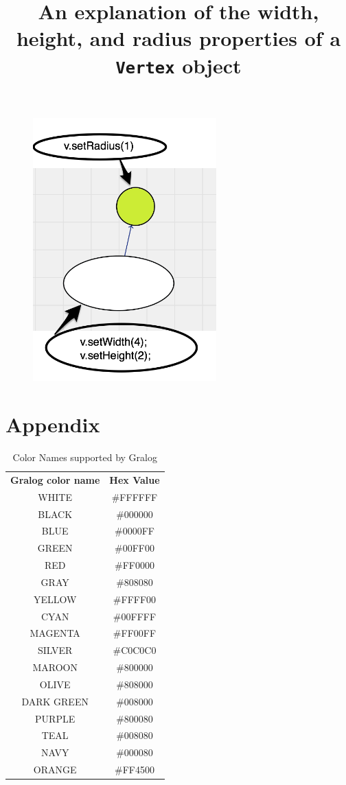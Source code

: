 \documentclass{article}
\begin{document}
\begin{figure}[H]
\title{An explanation of the width, height, and radius properties of a \texttt{Vertex} object}
\label{radiusWidthHeightDiagram}
\centering
\includegraphics[width=200pt]{radiusWidthHeightDiagram.png}
\end{figure}

\section{Appendix}


\begin{table}[h!]
  \begin{center}
    \caption{Color Names supported by Gralog}
    \label{colorNamesSupportedByGralog}
    \begin{tabular}{c|c} %
      \textbf{Gralog color name} & \textbf{Hex Value}\\
      WHITE   &\#FFFFFF\\
\hline
BLACK   &\#000000\\
\hline
BLUE    &\#0000FF\\
\hline
GREEN   &\#00FF00\\
\hline
RED     &\#FF0000\\
\hline
GRAY    &\#808080\\
\hline
YELLOW  &\#FFFF00\\
\hline
CYAN    &\#00FFFF\\
\hline
MAGENTA &\#FF00FF\\
\hline
SILVER  &\#C0C0C0\\
\hline
MAROON  &\#800000\\
\hline
OLIVE &\#808000\\
\hline
DARK GREEN &\#008000\\
\hline
PURPLE  &\#800080\\
\hline
TEAL  &\#008080\\
\hline
NAVY    &\#000080\\
\hline
ORANGE  &\#FF4500
    \end{tabular}
  \end{center}
\end{table}
\end{document}
